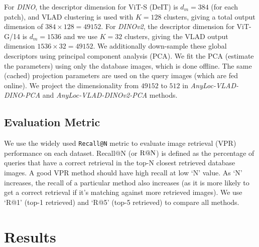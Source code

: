 For \emph{DINO}, the descriptor dimension for ViT-S (DeIT) is $d_m =
384$ (for each patch), and VLAD clustering is used with $K = 128$
clusters, giving a total output dimension of $384 \times 128 = 49152$.
For \emph{DINOv2}, the descriptor dimension for ViT-G/14 is $d_m =
1536$ and we use $K = 32$ clusters, giving the VLAD output dimension
$1536 \times 32 = 49152$. We additionally down-sample these global
descriptors using principal component analysis (PCA). We fit the PCA
(estimate the parameters) using only the database images, which is
done offline. The same (cached) projection parameters are used on the
query images (which are fed online). We project the dimensionality
from $49152$ to $512$ in \emph{AnyLoc-VLAD-DINO-PCA} and
\emph{AnyLoc-VLAD-DINOv2-PCA} methods.

\subsection{Evaluation Metric}

We use the widely used \texttt{Recall@N} metric to evaluate image
retrieval (VPR) performance on each dataset. Recall@N (or
$\textup{R@N}$) is defined as the percentage of queries that have a
correct retrieval in the top-N closest retrieved database images. A
good VPR method should have high recall at low `N' value. As `N'
increases, the recall of a particular method also increases (as it is
more likely to get a correct retrieval if it's matching against more
retrieved images). We use `R@1' (top-1 retrieved) and `R@5' (top-5
retrieved) to compare all methods.

\section{Results}


